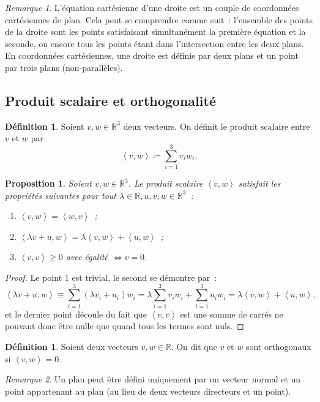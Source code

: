 \documentclass{article}
\newcommand{\R}{\mathbb R}
\newcommand{\scpr}[2]{\left\langle #1, #2\right\rangle}
\newtheorem{prp}[thm]{Proposition}
\theoremstyle{definition}
\newtheorem{déf}[thm]{Définition}
\theoremstyle{remark}
\newtheorem*{rmq}{Remarque}
\begin{document}
		\begin{rmq} L'équation cartésienne d'une droite est un couple de coordonnées cartésiennes de plan. Cela peut se comprendre comme suit~: l'ensemble des points de
		la droite sont les points satisfaisant simultanément la première équation et la seconde, ou encore tous les points étant dans l'intersection entre les deux plans.
		En coordonnées cartésiennes, une droite est définie par deux plans et un point par trois plans (non-parallèles). \end{rmq}

	\subsection{Produit scalaire et orthogonalité}
		\begin{déf} Soient $v, w \in \R^3$ deux vecteurs. On définit le produit scalaire entre $v$ et $w$ par \[\scpr vw \coloneqq \sum_{i=1}^3v_iw_i.\] \end{déf}

		\begin{prp} Soient $v, w \in \R^3$. Le produit scalaire $\scpr vw$ satisfait les propriétés suivantes pour tout $\lambda \in \R, u, v ,w \in \R^3$~:
		\begin{enumerate}
			\item $\scpr vw = \scpr wv$~;
			\item $\scpr {\lambda v+u}w = \lambda \scpr vw + \scpr uw$~;
			\item $\scpr vv \geq 0$ avec égalité $\iff v = 0$.
		\end{enumerate}
		\end{prp}

		\begin{proof} Le point 1 est trivial, le second se démontre par~:
		\[\scpr {\lambda v+u}w \equiv \sum_{i=1}^3(\lambda v_i + u_i)w_i = \lambda \sum_{i=1}^3v_iw_i + \sum_{i=1}^3u_iw_i = \lambda \scpr vw + \scpr uw,\]
		et le dernier point découle du fait que $\scpr vv$ est une somme de carrés ne pouvant donc être nulle que quand tous les termes sont nuls. \end{proof}

		\begin{déf} Soient deux vecteurs $v, w \in \R$. On dit que $v$ et $w$ sont orthogonaux si $\scpr vw = 0$. \end{déf}

		\begin{rmq} Un plan peut être défini uniquement par un vecteur normal et un point appartenant au plan (au lieu de deux vecteurs directeurs et un point). \end{rmq}
\end{document}
